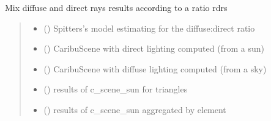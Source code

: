 \documentclass[letterpaper,10pt,english]{sphinxmanual}
\begin{document}

\begin{fulllineitems}
\label{\detokenize{reference:outputs.out_caribu_mix}}
\pysigstartsignatures
{}
\pysigstopsignatures
\sphinxAtStartPar
Mix diffuse and direct rays results according to a ratio rdrs
\begin{quote}\begin{description}
\begin{itemize}
\item {} 
\sphinxAtStartPar
{} () \textendash{} Spitters’s model estimating for the diffuse:direct ratio

\item {} 
\sphinxAtStartPar
{} () \textendash{} CaribuScene with direct lighting computed (from a sun)

\item {} 
\sphinxAtStartPar
{} () \textendash{} CaribuScene with diffuse lighting computed (from a sky)

\item {} 
\sphinxAtStartPar
{} () \textendash{} results of c\_scene\_sun for triangles

\item {} 
\sphinxAtStartPar
{} () \textendash{} results of c\_scene\_sun aggregated by element


\end{itemize}
\end{description}
\end{quote}
\end{fulllineitems}
\end{document}

